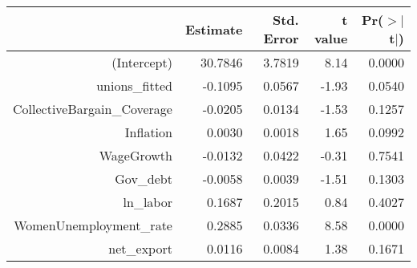 \begin{table}[ht]
\centering
\begin{tabular}{rrrrr}
  \hline
 & Estimate & Std. Error & t value & Pr($>$$|$t$|$) \\ 
  \hline
(Intercept) & 30.7846 & 3.7819 & 8.14 & 0.0000 \\ 
  unions\_fitted & -0.1095 & 0.0567 & -1.93 & 0.0540 \\ 
  CollectiveBargain\_Coverage & -0.0205 & 0.0134 & -1.53 & 0.1257 \\ 
  Inflation & 0.0030 & 0.0018 & 1.65 & 0.0992 \\ 
  WageGrowth & -0.0132 & 0.0422 & -0.31 & 0.7541 \\ 
  Gov\_debt & -0.0058 & 0.0039 & -1.51 & 0.1303 \\ 
  ln\_labor & 0.1687 & 0.2015 & 0.84 & 0.4027 \\ 
  WomenUnemployment\_rate & 0.2885 & 0.0336 & 8.58 & 0.0000 \\ 
  net\_export & 0.0116 & 0.0084 & 1.38 & 0.1671 \\ 
   \hline
\end{tabular}
\end{table}
